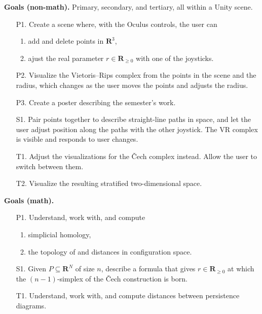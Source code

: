 \documentclass[10pt]{article}
\newcommand\R{\mathbf{R}}
\begin{document}
\vspacing
\noindent
\textbf{Goals (non-math).}  Primary, secondary, and tertiary, all within a Unity scene.
\begin{enumerate}
\item[P1.] Create a scene where, with the Oculus controls, the user can
\begin{enumerate}
\item add and delete points in $\R^3$,
\item ajust the real parameter $r \in \R_{\geqslant 0}$ with one of the joysticks.
\end{enumerate}
\item[P2.] Visualize the Vietoris--Rips complex from the points in the scene and the radius, which changes as the user moves the points and adjusts the radius.
\item[P3.] Create a poster describing the semester's work.
\item[S1.] Pair points together to describe straight-line paths in space, and let the user adjust position along the paths with the other joystick. The VR complex is visible and responds to user changes.
\item[T1.] Adjust the visualizations for the \v Cech complex instead. Allow the user to switch between them.
\item[T2.] Visualize the resulting stratified two-dimensional space.
\end{enumerate}

\vspacing

\noindent
\textbf{Goals (math).}
\begin{enumerate}
\item[P1.] Understand, work with, and compute
\begin{enumerate}
\item simplicial homology,
\item the topology of and distances in configuration space.
\end{enumerate}
\item[S1.] Given $P\subseteq \R^N$ of size $n$, describe a formula that gives $r\in \R_{\geqslant 0}$ at which the $(n-1)$-simplex of the \v Cech construction is born.
\item[T1.] Understand, work with, and compute distances between persistence diagrams.
\end{enumerate}

\vspacing
\end{document}
